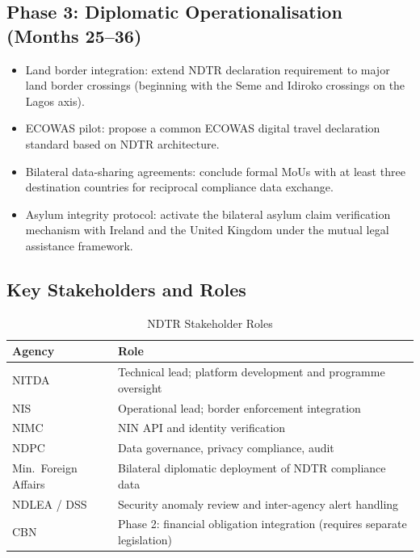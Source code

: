 \documentclass[11pt]{article}
\begin{document}
\subsection{Phase 3: Diplomatic Operationalisation (Months 25--36)}

\begin{itemize}
  \item Land border integration: extend NDTR declaration requirement
  to major land border crossings (beginning with the Seme and
  Idiroko crossings on the Lagos axis).
  \item ECOWAS pilot: propose a common ECOWAS digital travel
  declaration standard based on NDTR architecture.
  \item Bilateral data-sharing agreements: conclude formal MoUs
  with at least three destination countries for reciprocal
  compliance data exchange.
  \item Asylum integrity protocol: activate the bilateral asylum
  claim verification mechanism with Ireland and the United Kingdom
  under the mutual legal assistance framework.
\end{itemize}

\subsection{Key Stakeholders and Roles}

\begin{table}[ht]
\caption{NDTR Stakeholder Roles}
\label{tab:stakeholders}
\small
\begin{tabularx}{\columnwidth}{@{}lX@{}}
\toprule
\textbf{Agency} & \textbf{Role} \\
\midrule
NITDA                & Technical lead; platform development and programme oversight \\
NIS                  & Operational lead; border enforcement integration \\
NIMC                 & NIN API and identity verification \\
NDPC                 & Data governance, privacy compliance, audit \\
Min.\ Foreign Affairs & Bilateral diplomatic deployment of NDTR compliance data \\
NDLEA / DSS          & Security anomaly review and inter-agency alert handling \\
CBN                  & Phase 2: financial obligation integration (requires separate legislation) \\
\bottomrule
\end{tabularx}
\end{table}
\end{document}
